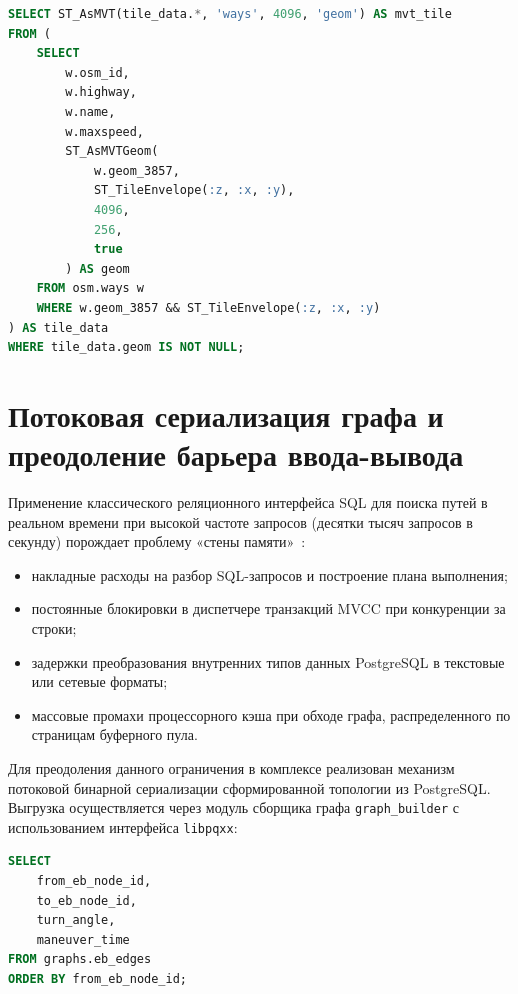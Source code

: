 \begin{lstlisting}[language=SQL, caption={Запрос динамической упаковки тайлов MVT}]
SELECT ST_AsMVT(tile_data.*, 'ways', 4096, 'geom') AS mvt_tile
FROM (
    SELECT 
        w.osm_id,
        w.highway,
        w.name,
        w.maxspeed,
        ST_AsMVTGeom(
            w.geom_3857,
            ST_TileEnvelope(:z, :x, :y),
            4096,
            256,
            true
        ) AS geom
    FROM osm.ways w
    WHERE w.geom_3857 && ST_TileEnvelope(:z, :x, :y)
) AS tile_data
WHERE tile_data.geom IS NOT NULL;
\end{lstlisting}

\section{Потоковая сериализация графа и преодоление барьера ввода-вывода}
\label{sec:io_serialization}

Применение классического реляционного интерфейса SQL для поиска путей в реальном времени при высокой частоте запросов (десятки тысяч запросов в секунду) порождает проблему «стены памяти»~\cite{drepper2007memory, mutlu2020primer}:
\begin{itemize}
    \item накладные расходы на разбор SQL-запросов и построение плана выполнения;
    \item постоянные блокировки в диспетчере транзакций MVCC при конкуренции за строки;
    \item задержки преобразования внутренних типов данных PostgreSQL в текстовые или сетевые форматы;
    \item массовые промахи процессорного кэша при обходе графа, распределенного по страницам буферного пула.
\end{itemize}

Для преодоления данного ограничения в комплексе реализован механизм потоковой бинарной сериализации сформированной топологии из PostgreSQL. Выгрузка осуществляется через модуль сборщика графа \texttt{graph\_builder} с использованием интерфейса \texttt{libpqxx}:
\begin{lstlisting}[language=SQL, caption={Потоковая выгрузка реберного графа из СУБД}]
SELECT 
    from_eb_node_id, 
    to_eb_node_id, 
    turn_angle, 
    maneuver_time 
FROM graphs.eb_edges 
ORDER BY from_eb_node_id;
\end{lstlisting}

